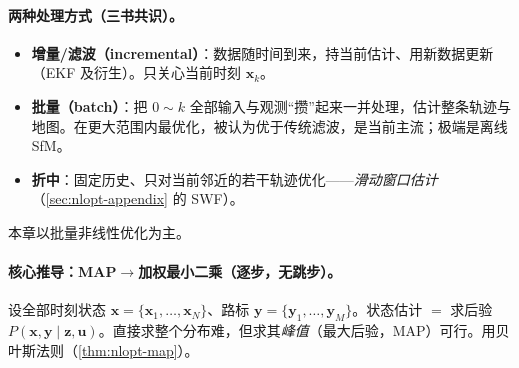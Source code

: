 \paragraph{两种处理方式（三书共识）。}\cite{gaoxiang2019slam14,barfoot2024state}
\begin{itemize}
  \item \textbf{增量/滤波（incremental）}：数据随时间到来，持当前估计、用新数据更新（EKF 及衍生）。只关心当前时刻 $\mathbf{x}_k$。
  \item \textbf{批量（batch）}：把 $0\sim k$ 全部输入与观测“攒”起来一并处理，估计整条轨迹与地图。在更大范围内最优化，被认为优于传统滤波\cite{gaoxiang2019slam14}，是当前主流；极端是离线 SfM。
  \item \textbf{折中}：固定历史、只对当前邻近的若干轨迹优化——\emph{滑动窗口估计}（\cref{sec:nlopt-appendix} 的 SWF）。
\end{itemize}
本章以批量非线性优化为主。

\paragraph{核心推导：MAP$\to$加权最小二乘（逐步，无跳步）。}
设全部时刻状态 $\mathbf{x}=\{\mathbf{x}_1,\dots,\mathbf{x}_N\}$、路标 $\mathbf{y}=\{\mathbf{y}_1,\dots,\mathbf{y}_M\}$。状态估计 $=$ 求后验 $P(\mathbf{x},\mathbf{y}\mid\mathbf{z},\mathbf{u})$\cite{gaoxiang2019slam14}。直接求整个分布难，但求其\emph{峰值}（最大后验，MAP）可行。用贝叶斯法则（\cref{thm:nlopt-map}）。

